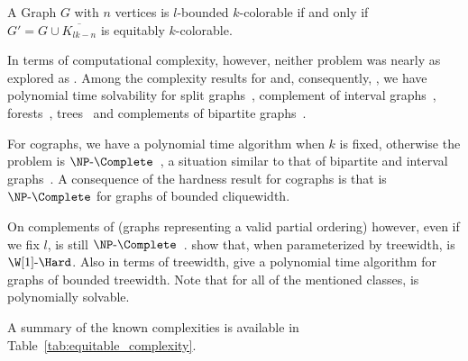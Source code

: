 \begin{observation*}
    A Graph $G$ with $n$ vertices is $l$-bounded $k$-colorable if and only if $G' = G \cup \overline{K_{lk - n}}$ is equitably $k$-colorable.
\end{observation*}


In terms of computational complexity, however, neither problem was nearly as explored as .
Among the complexity results for  and, consequently, , we have polynomial time solvability for split graphs~\citep{equitable_split}, complement of interval graphs~\citep{graph_partitioning1}, forests~\citep{mutual_exclusion_scheduling}, trees~\citep{equitable_trees} and complements of bipartite graphs~\citep{graph_partitioning1}.

For cographs, we have a polynomial time algorithm when $k$ is fixed, otherwise the problem is $\NPc$~\citep{graph_partitioning1}, a situation similar to that of bipartite and interval graphs~\citep{graph_partitioning1}.
A consequence of the hardness result for cographs is that  is $\NPc$ for graphs of bounded cliquewidth.

On complements of  (graphs representing a valid partial ordering) however, even if we fix $l$,  is still $\NPc$~\citep{chain_antichain}.
\citep{colorful_treewidth} show that, when parameterized by treewidth,  is $\W[1]\text{-}\Hard$.
Also in terms of treewidth, \citep{equitable_treewidth} give a polynomial time algorithm for graphs of bounded treewidth.
Note that for all of the mentioned classes,  is polynomially solvable.

A summary of the known complexities is available in Table~\ref{tab:equitable_complexity}.


